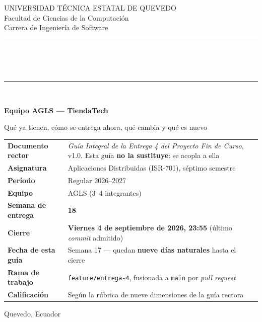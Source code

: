 \documentclass[11pt,a4paper]{article}
\begin{document}
\begin{titlepage}
	\centering
	\vspace*{0.8cm}
	{\small\color{uteqGray} UNIVERSIDAD TÉCNICA ESTATAL DE QUEVEDO\\ Facultad de Ciencias de la Computación\\ Carrera de Ingeniería de Software\par}
	\vspace{14pt}
	{\color{uteqBlue}\rule{\textwidth}{2pt}}\\[7pt]
	\colorbox{uteqBlue}{\parbox{0.96\textwidth}{\centering{}\vspace{5pt}}}\\[7pt]
	{\color{uteqBlue}\rule{\textwidth}{2pt}}\\[16pt]
	{\LARGE\bfseries\color{uteqBlue} Equipo AGLS --- TiendaTech\par}
	\vspace{5pt}
	{\large\color{uteqGray} Qué ya tienen, cómo se entrega ahora, qué cambia y qué es nuevo\par}
	\vspace{20pt}
	\begin{minipage}{0.93\textwidth}
		\small
		\begin{tabular}{@{}p{4.6cm}p{9.8cm}@{}}
			\toprule
			\textbf{Documento rector} & \emph{Guía Integral de la Entrega 4 del Proyecto Fin de Curso}, v1.0. Esta guía \textbf{no la sustituye}: se acopla a ella \\
			\textbf{Asignatura} & Aplicaciones Distribuidas (ISR-701), séptimo semestre \\
			\textbf{Período} & Regular 2026--2027 \\
			\textbf{Equipo} & AGLS (3--4 integrantes) \\
			\textbf{Semana de entrega} & \textbf{18} \\
			\textbf{Cierre} & \textbf{Viernes 4 de septiembre de 2026, 23:55} (último \emph{commit} admitido) \\
			\textbf{Fecha de esta guía} & Semana 17 --- quedan \textbf{nueve días naturales} hasta el cierre \\
			\textbf{Rama de trabajo} & \texttt{feature/entrega-4}, fusionada a \texttt{main} por \emph{pull request} \\
			\textbf{Calificación} & Según la rúbrica de nueve dimensiones de la guía rectora \\
			\bottomrule
		\end{tabular}
	\end{minipage}
	\vfill
	{\small\color{uteqGray} Quevedo, Ecuador\par}
\end{titlepage}
\end{document}
